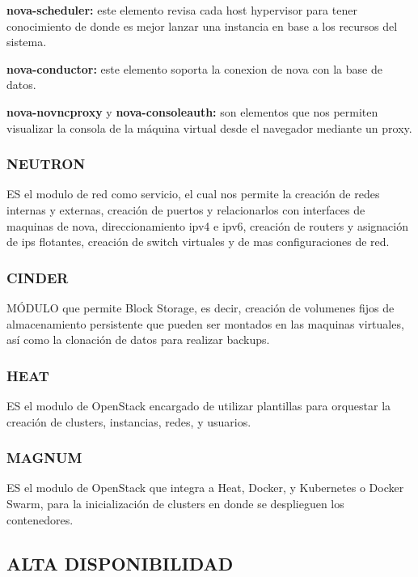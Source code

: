     \textbf{nova-scheduler:} este elemento revisa cada host hypervisor para tener conocimiento de donde es mejor lanzar una instancia en base a los recursos del sistema.
    
    \textbf{nova-conductor:} este elemento soporta la conexion de nova con la base de datos.
    
    \textbf{nova-novncproxy} y \textbf{nova-consoleauth:} son elementos que nos permiten visualizar la consola de la máquina virtual desde el navegador mediante un proxy.
    
    \subsubsection{NEUTRON}
    
    ES el modulo de red como servicio, el cual nos permite la creación de redes internas y externas, creación de puertos y relacionarlos con interfaces de maquinas de nova, direccionamiento ipv4 e ipv6, creación de routers y asignación de ips flotantes, creación de switch virtuales y de mas configuraciones de red.
    
    \subsubsection{CINDER}
    
    MÓDULO que permite Block Storage, es decir, creación de volumenes fijos de almacenamiento persistente que pueden ser montados en las maquinas virtuales, así como la clonación de datos para realizar backups.
    
    \subsubsection{HEAT}
    
    ES el modulo de OpenStack encargado de utilizar plantillas para orquestar la creación de clusters, instancias, redes, y usuarios.
    
    \subsubsection{MAGNUM}
    
    ES el modulo de OpenStack que integra a Heat, Docker, y Kubernetes o Docker Swarm, para la inicialización de clusters en donde se desplieguen los contenedores.
    
    \subsection{ALTA DISPONIBILIDAD} 
    
